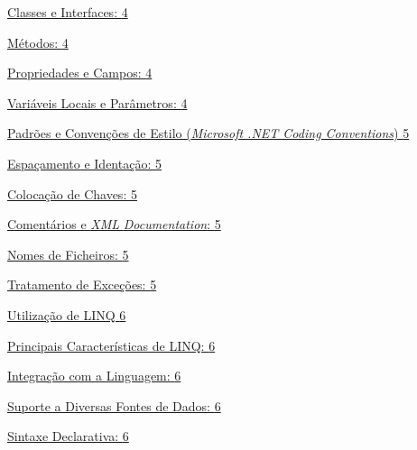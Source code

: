 \documentclass[
]{article}
\begin{document}
\protect\hyperlink{classes-e-interfaces}{Classes e Interfaces:
\protect\hyperlink{classes-e-interfaces}{4}}

\protect\hyperlink{muxe9todos}{Métodos:
\protect\hyperlink{muxe9todos}{4}}

\protect\hyperlink{propriedades-e-campos}{Propriedades e Campos:
\protect\hyperlink{propriedades-e-campos}{4}}

\protect\hyperlink{variuxe1veis-locais-e-paruxe2metros}{Variáveis Locais
e Parâmetros:
\protect\hyperlink{variuxe1veis-locais-e-paruxe2metros}{4}}

\protect\hyperlink{padruxf5es-e-convenuxe7uxf5es-de-estilo-microsoft-.net-coding-conventions}{Padrões
e Convenções de Estilo (\emph{Microsoft .NET Coding Conventions})
\protect\hyperlink{padruxf5es-e-convenuxe7uxf5es-de-estilo-microsoft-.net-coding-conventions}{5}}

\protect\hyperlink{espauxe7amento-e-identauxe7uxe3o}{Espaçamento e
Identação: \protect\hyperlink{espauxe7amento-e-identauxe7uxe3o}{5}}

\protect\hyperlink{colocauxe7uxe3o-de-chaves}{Colocação de Chaves:
\protect\hyperlink{colocauxe7uxe3o-de-chaves}{5}}

\protect\hyperlink{comentuxe1rios-e-xml-documentation}{Comentários e
\emph{XML} \emph{Documentation}:
\protect\hyperlink{comentuxe1rios-e-xml-documentation}{5}}

\protect\hyperlink{nomes-de-ficheiros}{Nomes de Ficheiros:
\protect\hyperlink{nomes-de-ficheiros}{5}}

\protect\hyperlink{tratamento-de-exceuxe7uxf5es}{Tratamento de Exceções:
\protect\hyperlink{tratamento-de-exceuxe7uxf5es}{5}}

\protect\hyperlink{utilizauxe7uxe3o-de-linq}{Utilização de LINQ
\protect\hyperlink{utilizauxe7uxe3o-de-linq}{6}}

\protect\hyperlink{principais-caracteruxedsticas-de-linq}{Principais
Características de LINQ:
\protect\hyperlink{principais-caracteruxedsticas-de-linq}{6}}

\protect\hyperlink{integrauxe7uxe3o-com-a-linguagem}{Integração com a
Linguagem: \protect\hyperlink{integrauxe7uxe3o-com-a-linguagem}{6}}

\protect\hyperlink{suporte-a-diversas-fontes-de-dados}{Suporte a
Diversas Fontes de Dados:
\protect\hyperlink{suporte-a-diversas-fontes-de-dados}{6}}

\protect\hyperlink{sintaxe-declarativa}{Sintaxe Declarativa:
\protect\hyperlink{sintaxe-declarativa}{6}}
\end{document}
